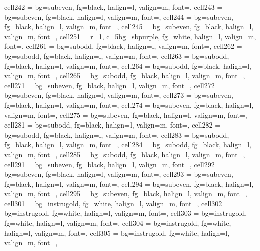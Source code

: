 \documentclass[a4paper,12pt]{article}
\begin{document}
\begin{longtblr}
{  cell{24}{2} = {bg=subeven, fg=black, halign=l, valign=m, font=\footnotesize},
  cell{24}{3} = {bg=subeven, fg=black, halign=l, valign=m, font=\footnotesize},
  cell{24}{4} = {bg=subeven, fg=black, halign=l, valign=m, font=\footnotesize},
  cell{24}{5} = {bg=subeven, fg=black, halign=l, valign=m, font=\footnotesize},
  cell{25}{1} = {r=1, c=5}{bg=sbpurple, fg=white, halign=l, valign=m, font=\small\bfseries},
  cell{26}{1} = {bg=subodd,  fg=black, halign=l, valign=m, font=\footnotesize},
  cell{26}{2} = {bg=subodd,  fg=black, halign=l, valign=m, font=\footnotesize},
  cell{26}{3} = {bg=subodd,  fg=black, halign=l, valign=m, font=\footnotesize},
  cell{26}{4} = {bg=subodd,  fg=black, halign=l, valign=m, font=\footnotesize},
  cell{26}{5} = {bg=subodd,  fg=black, halign=l, valign=m, font=\footnotesize},
  cell{27}{1} = {bg=subeven, fg=black, halign=l, valign=m, font=\footnotesize},
  cell{27}{2} = {bg=subeven, fg=black, halign=l, valign=m, font=\footnotesize},
  cell{27}{3} = {bg=subeven, fg=black, halign=l, valign=m, font=\footnotesize},
  cell{27}{4} = {bg=subeven, fg=black, halign=l, valign=m, font=\footnotesize},
  cell{27}{5} = {bg=subeven, fg=black, halign=l, valign=m, font=\footnotesize},
  cell{28}{1} = {bg=subodd,  fg=black, halign=l, valign=m, font=\footnotesize},
  cell{28}{2} = {bg=subodd,  fg=black, halign=l, valign=m, font=\footnotesize},
  cell{28}{3} = {bg=subodd,  fg=black, halign=l, valign=m, font=\footnotesize},
  cell{28}{4} = {bg=subodd,  fg=black, halign=l, valign=m, font=\footnotesize},
  cell{28}{5} = {bg=subodd,  fg=black, halign=l, valign=m, font=\footnotesize},
  cell{29}{1} = {bg=subeven, fg=black, halign=l, valign=m, font=\footnotesize},
  cell{29}{2} = {bg=subeven, fg=black, halign=l, valign=m, font=\footnotesize},
  cell{29}{3} = {bg=subeven, fg=black, halign=l, valign=m, font=\footnotesize},
  cell{29}{4} = {bg=subeven, fg=black, halign=l, valign=m, font=\footnotesize},
  cell{29}{5} = {bg=subeven, fg=black, halign=l, valign=m, font=\footnotesize},
  cell{30}{1} = {bg=instrugold, fg=white, halign=l, valign=m, font=\footnotesize},
  cell{30}{2} = {bg=instrugold, fg=white, halign=l, valign=m, font=\footnotesize},
  cell{30}{3} = {bg=instrugold, fg=white, halign=l, valign=m, font=\footnotesize},
  cell{30}{4} = {bg=instrugold, fg=white, halign=l, valign=m, font=\footnotesize},
  cell{30}{5} = {bg=instrugold, fg=white, halign=l, valign=m, font=\footnotesize},
}
\end{longtblr}
\end{document}
